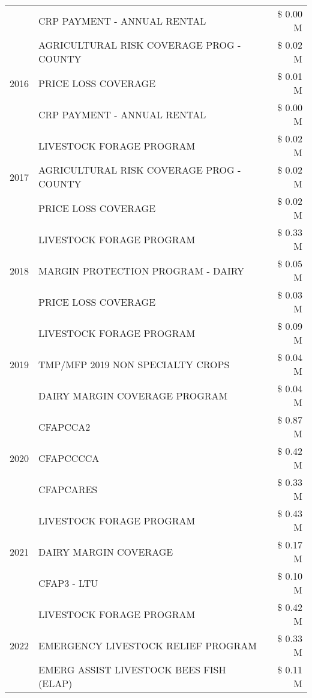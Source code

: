 \begin{tabular}{llr}
 & CRP PAYMENT - ANNUAL RENTAL & \$ 0.00 M \\
\cline{1-3}
\multirow[t]{3}{*}{2016} & AGRICULTURAL RISK COVERAGE PROG - COUNTY & \$ 0.02 M \\
 & PRICE LOSS COVERAGE & \$ 0.01 M \\
 & CRP PAYMENT - ANNUAL RENTAL & \$ 0.00 M \\
\cline{1-3}
\multirow[t]{3}{*}{2017} & LIVESTOCK FORAGE PROGRAM & \$ 0.02 M \\
 & AGRICULTURAL RISK COVERAGE PROG - COUNTY & \$ 0.02 M \\
 & PRICE LOSS COVERAGE & \$ 0.02 M \\
\cline{1-3}
\multirow[t]{3}{*}{2018} & LIVESTOCK FORAGE PROGRAM & \$ 0.33 M \\
 & MARGIN PROTECTION PROGRAM - DAIRY & \$ 0.05 M \\
 & PRICE LOSS COVERAGE & \$ 0.03 M \\
\cline{1-3}
\multirow[t]{3}{*}{2019} & LIVESTOCK FORAGE PROGRAM & \$ 0.09 M \\
 & TMP/MFP 2019 NON SPECIALTY CROPS & \$ 0.04 M \\
 & DAIRY MARGIN COVERAGE PROGRAM & \$ 0.04 M \\
\cline{1-3}
\multirow[t]{3}{*}{2020} & CFAPCCA2 & \$ 0.87 M \\
 & CFAPCCCCA & \$ 0.42 M \\
 & CFAPCARES & \$ 0.33 M \\
\cline{1-3}
\multirow[t]{3}{*}{2021} & LIVESTOCK FORAGE PROGRAM & \$ 0.43 M \\
 & DAIRY MARGIN COVERAGE & \$ 0.17 M \\
 & CFAP3 - LTU & \$ 0.10 M \\
\cline{1-3}
\multirow[t]{3}{*}{2022} & LIVESTOCK FORAGE PROGRAM & \$ 0.42 M \\
 & EMERGENCY LIVESTOCK RELIEF PROGRAM & \$ 0.33 M \\
 & EMERG ASSIST LIVESTOCK BEES FISH (ELAP) & \$ 0.11 M \\
\cline{1-3}
\bottomrule
\end{tabular}
